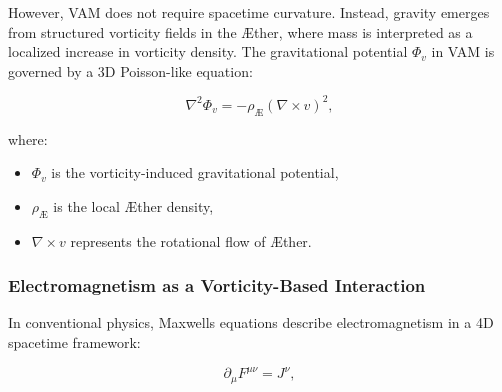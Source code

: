     However, VAM does not require spacetime curvature. Instead, gravity emerges from structured vorticity fields in the Æther, where mass is interpreted as a localized increase in vorticity density. The gravitational potential \( \Phi_v \) in VAM is governed by a 3D Poisson-like equation:

    \begin{equation*}
        \nabla^2 \Phi_v = -\rho_\text{Æ} (\nabla \times v)^2,
    \end{equation*}

    where:
    \begin{itemize}
        \item \( \Phi_v \) is the vorticity-induced gravitational potential,
        \item \( \rho_\text{Æ} \) is the local Æther density,
        \item \( \nabla \times v \) represents the rotational flow of Æther.
    \end{itemize}


\begin{table}[h]
    \centering
    \caption{Comparison between General Relativity and VAM}
    \label{tab:GR_vs_VAM}
\end{table}


    \subsubsection*{Electromagnetism as a Vorticity-Based Interaction}

    In conventional physics, Maxwell\rqs s equations describe electromagnetism in a 4D spacetime framework:

    \begin{equation*}
        \partial_\mu F^{\mu\nu} = J^\nu,
    \end{equation*}

